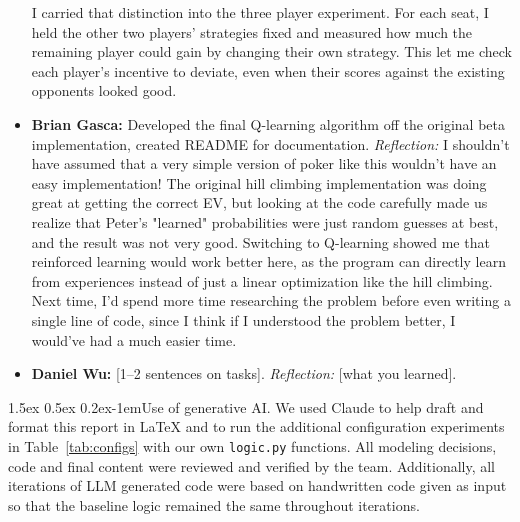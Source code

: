 \documentclass{article}
\makeatletter
\renewcommand{\paragraph}{\@startsection{paragraph}{4}{\z@}%
    {1.5ex \@plus 0.5ex \@minus 0.2ex}{-1em}{\normalsize\bf}}
\newcommand{\code}[1]{\texttt{#1}}
\makeatother
\begin{document}
\begin{itemize}
I carried that distinction into the three player experiment. For each seat, I held the other two players' strategies fixed and measured how much the remaining player could gain by changing their own strategy. This let me check each player's incentive to deviate, even when their scores against the existing opponents looked good.
  \item \textbf{Brian Gasca:} Developed the final Q-learning algorithm off the original beta implementation,  created README for documentation. \emph{Reflection:} I shouldn't have assumed that a very simple version of poker like this wouldn't have an easy implementation! The original hill climbing implementation was doing great at getting the correct EV, but looking at the code carefully made us realize that Peter's "learned" probabilities were just random guesses at best, and the result was not very good. Switching to Q-learning showed me that reinforced learning would work better here, as the program can directly learn from experiences instead of just a linear optimization like the hill climbing. Next time, I'd spend more time researching the problem before even writing a single line of code, since I think if I understood the problem better, I would've had a much easier time.
  \item \textbf{Daniel Wu:} [1--2 sentences on tasks]. \emph{Reflection:} [what you learned].
\end{itemize}

\paragraph{Use of generative AI.} 
We used Claude to help draft and format this report in LaTeX and to run the additional configuration experiments in Table~\ref{tab:configs} with our own \code{logic.py} functions. All modeling decisions, code and final content were reviewed and verified by the team. Additionally, all iterations of LLM generated code were based on handwritten code given as input so that the baseline logic remained the same throughout iterations.



\end{document}
